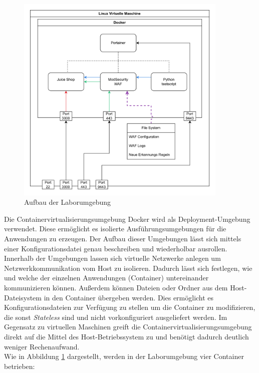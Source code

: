\begin{figure}[!hbt]
    \centering
    \includegraphics[width=0.9\textwidth]{./images/lab-setup.png}
    \caption{Aufbau der Laborumgebung}
    \label{fig:lab}
\end{figure}

Die Containervirtualisierungsumgebung Docker wird als Deployment-Umgebung verwendet.
Diese ermöglicht es isolierte Ausführungsumgebungen für die Anwendungen zu erzeugen.
Der Aufbau dieser Umgebungen lässt sich mittels einer Konfigurationsdatei genau beschreiben und wiederholbar ausrollen.
Innerhalb der Umgebungen lassen sich virtuelle Netzwerke anlegen um Netzwerkkommunikation vom Host zu isolieren.
Dadurch lässt sich festlegen, wie und welche der einzelnen Anwendungen (Container) untereinander kommunizieren können.
Außerdem können Dateien oder Ordner aus dem Host-Dateisystem in den Container übergeben werden.
Dies ermöglicht es Konfigurationsdateien zur Verfügung zu stellen um die Container zu modifizieren, die sonst \textit{Stateless} sind und nicht vorkonfiguriert ausgeliefert werden.
Im Gegensatz zu virtuellen Maschinen greift die Containervirtualisierungsumgebung direkt auf die Mittel des Host-Betriebssystem zu und benötigt dadurch deutlich weniger Rechenaufwand.\\

Wie in Abbildung \ref{fig:lab} dargestellt, werden in der Laborumgebung vier Container betrieben:

